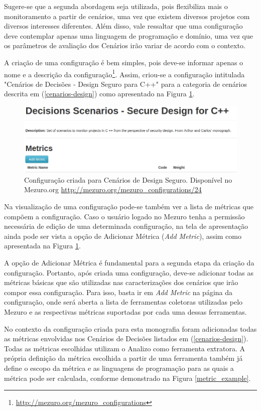 Sugere-se que a segunda abordagem seja utilizada, pois flexibiliza mais o monitoramento a partir de cenários, uma vez que existem diversos projetos com diversos interesses diferentes. Além disso, vale ressaltar que uma configuração deve contemplar apenas uma linguagem de programação e domínio, uma vez que os parâmetros de avaliação dos Cenários irão variar de acordo com o contexto.

A criação de uma configuração é bem simples, pois deve-se informar apenas o nome e a descrição da configuração\footnote{\url{http://mezuro.org/mezuro_configurations}}. Assim, criou-se a configuração intitulada "Cenários de Decisões - Design Seguro para C++" para a categoria de cenários descrita em (\ref{cenarios-design}) como apresentado na Figura \ref{cenario_design}.

\graphicspath{{figuras/}}
\begin{figure}[h]
\centering
\includegraphics[width=1.0\textwidth]{cenario_design}
\caption{Configuração criada para Cenários de Design Seguro. Disponível no Mezuro.org \url{http://mezuro.org/mezuro_configurations/24}}
\label{cenario_design}
\end{figure}

Na visualização de uma configuração pode-se também ver a lista de métricas que compõem a configuração. Caso o usuário logado no Mezuro tenha a permissão  necessária de edição de uma determinada configuração, na tela de apresentação ainda pode ser vista a opção de Adicionar Métrica (\emph{Add Metric}), assim como apresentada na Figura \ref{cenario_design}. 

A opção de Adicionar Métrica é fundamental para a segunda etapa da criação da configuração. Portanto, após criada uma configuração, deve-se adicionar todas as métricas básicas que são utilizadas nas caracterizações dos cenários que irão compor essa configuração. Para isso, basta ir em \emph{Add Metric} na página da configuração, onde será aberta a lista de ferramentas coletoras utilizadas pelo Mezuro e as respectivas métricas suportadas por cada uma dessas ferramentas. 

No contexto da configuração criada para esta monografia foram adicionadas todas as métricas envolvidas nos Cenários de Decisões listados em (\ref{cenarios-design}). Todas as métricas escolhidas utilizam o Analizo como ferramenta extratora. A própria definição da métrica escolhida a partir de uma ferramenta também já define o escopo da métrica e as linguagens de programação para as quais a métrica pode ser calculada, conforme demonstrado na Figura \ref{metric_example}.

